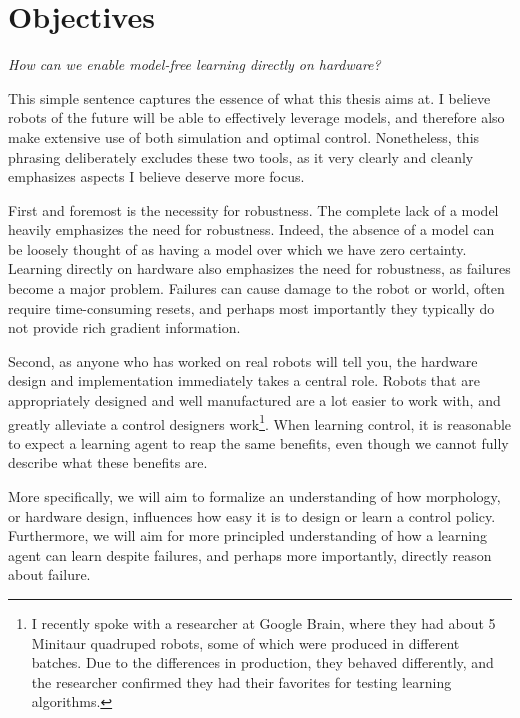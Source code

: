 \section{Objectives}
\emph{How can we enable model-free learning directly on hardware?} \par
This simple sentence captures the essence of what this thesis aims at. I believe robots of the future will be able to effectively leverage models, and therefore also make extensive use of both simulation and optimal control.
Nonetheless, this phrasing deliberately excludes these two tools, as it very clearly and cleanly emphasizes aspects I believe deserve more focus.\par
First and foremost is the necessity for robustness. The complete lack of a model heavily emphasizes the need for robustness. Indeed, the absence of a model can be loosely thought of as having a model over which we have zero certainty. Learning directly on hardware also emphasizes the need for robustness, as failures become a major problem. Failures can cause damage to the robot or world, often require time-consuming resets, and perhaps most importantly they typically do not provide rich gradient information. \par
Second, as anyone who has worked on real robots will tell you, the hardware design and implementation immediately takes a central role. Robots that are appropriately designed and well manufactured are a lot easier to work with, and greatly alleviate a control designers work\footnote{I recently spoke with a researcher at Google Brain, where they had about 5 Minitaur quadruped robots, some of which were produced in different batches. Due to the differences in production, they behaved differently, and the researcher confirmed they had their favorites for testing learning algorithms.}. When learning control, it is reasonable to expect a learning agent to reap the same benefits, even though we cannot fully describe what these benefits are. \par

More specifically, we will aim to formalize an understanding of how morphology, or hardware design, influences how easy it is to design or learn a control policy. Furthermore, we will aim for more principled understanding of how a learning agent can learn despite failures, and perhaps more importantly, directly reason about failure.


